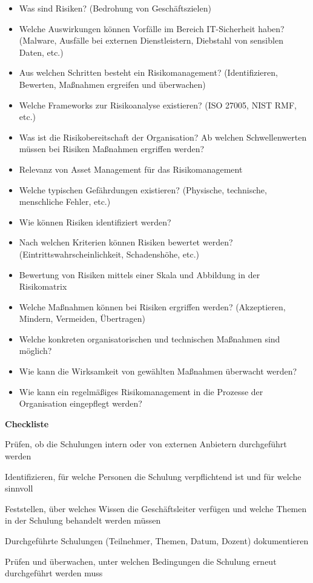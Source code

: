 \begin{itemize}
\begin{itemize}
        \item Was sind Risiken? (Bedrohung von Geschäftszielen)
        \item Welche Auswirkungen können Vorfälle im Bereich IT-Sicherheit haben? (Malware, Ausfälle bei externen Dienstleistern, Diebstahl von sensiblen Daten, etc.)
        \item Aus welchen Schritten besteht ein Risikomanagement? (Identifizieren, Bewerten, Maßnahmen ergreifen und überwachen)
        \item Welche Frameworks zur Risikoanalyse existieren? (ISO 27005, NIST RMF, etc.)
        \item Was ist die Risikobereitschaft der Organisation? Ab welchen Schwellenwerten müssen bei Risiken Maßnahmen ergriffen werden?
        \item Relevanz von Asset Management für das Risikomanagement
        \item Welche typischen Gefährdungen existieren? (Physische, technische, menschliche Fehler, etc.)
        \item Wie können Risiken identifiziert werden?
        \item Nach welchen Kriterien können Risiken bewertet werden? (Eintrittswahrscheinlichkeit, Schadenshöhe, etc.)
        \item Bewertung von Risiken mittels einer Skala und Abbildung in der Risikomatrix
        \item Welche Maßnahmen können bei Risiken ergriffen werden? (Akzeptieren, Mindern, Vermeiden, Übertragen)
        \item Welche konkreten organisatorischen und technischen Maßnahmen sind möglich?
        \item Wie kann die Wirksamkeit von gewählten Maßnahmen überwacht werden?
        \item Wie kann ein regelmäßiges Risikomanagement in die Prozesse der Organisation eingepflegt werden?
    \end{itemize}
\end{itemize}

\textbf{Checkliste}
\begin{checklist}
\item Prüfen, ob die Schulungen intern oder von externen Anbietern durchgeführt werden
\item Identifizieren, für welche Personen die Schulung verpflichtend ist und für welche sinnvoll
\item Feststellen, über welches Wissen die Geschäftsleiter verfügen und welche Themen in der Schulung behandelt werden müssen
\item Durchgeführte Schulungen (Teilnehmer, Themen, Datum, Dozent) dokumentieren
\item Prüfen und überwachen, unter welchen Bedingungen die Schulung erneut durchgeführt werden muss
\end{checklist}
